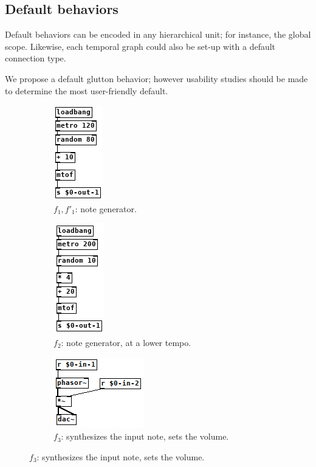 \documentclass{article}
\begin{document}
\subsection{Default behaviors}
Default behaviors can be encoded in any hierarchical unit; for instance, the global scope. 
Likewise, each temporal graph could also be set-up with a default connection type.

We propose a default glutton behavior; however usability studies should be made to determine the most user-friendly default.

\begin{figure}
    \centering
    \begin{subfigure}{0.21\textwidth}\centering
        \includegraphics[scale=0.5]{images/pd-1.png}
        \caption{$f_1, f'_1$: note generator.}
    \end{subfigure}
    \begin{subfigure}{0.21\textwidth}\centering
        \includegraphics[scale=0.5]{images/pd-2.png}
        \caption{$f_2$: note generator, at a lower tempo.}
    \end{subfigure}
    
    \begin{subfigure}{0.21\textwidth}\centering
        \includegraphics[scale=0.5]{images/pd-3.png}
        \caption{$f_3$: synthesizes the input note, sets the volume.}
    \end{subfigure}
    

\end{figure}
\end{document}
